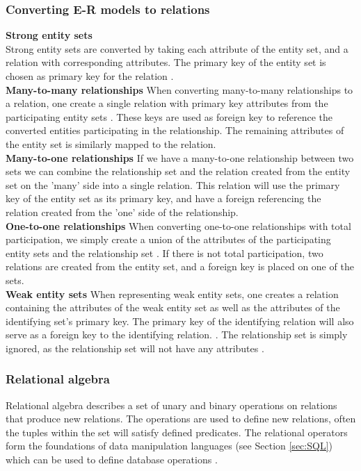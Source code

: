 \subsubsection*{Converting E-R models to relations}
\textbf{Strong entity sets}\\
Strong entity sets are converted by taking each attribute of the entity set, and a relation with corresponding attributes. 
The primary key of the entity set is chosen as primary key for the relation \cite[Chapter 6.7.1]{DBSBook}.\\
\textbf{Many-to-many relationships}
When converting many-to-many relationships to a relation, one create a single relation with primary key attributes from the participating entity sets \cite[Chapter 6.7.1]{DBSBook}. These keys are used as foreign key to reference the converted entities participating in the relationship. 
The remaining attributes of the entity set is similarly mapped to the relation.\\
\textbf{Many-to-one relationships}
If we have a many-to-one relationship between two sets we can combine the relationship set and the relation created from the entity set on the 'many' side into a single relation. This relation will use the primary key of the entity set as its primary key, and have a foreign referencing the relation created from the 'one' side of the relationship.\\
\textbf{One-to-one relationships}
When converting one-to-one relationships with total participation, we simply create a union of the attributes of the participating entity sets and the relationship set \cite[Chapter 6.7.6]{DBSBook}. If there is not total participation, two relations are created from the entity set, and a foreign key is placed on one of the sets.\\
\textbf{Weak entity sets}
When representing weak entity sets, one creates a relation containing the attributes of the weak entity set as well as the attributes of the identifying set's primary key.
The primary key of the identifying relation will also serve as a foreign key to the identifying relation. \cite[Chapter 6.7.1]{DBSBook}.
The relationship set is simply ignored, as the relationship set will not have any attributes \cite[Chapter 6.7.5]{DBSBook}. 


\subsubsection{Relational algebra}\label{sec:relationalAlgebra}
Relational algebra describes a set of unary and binary operations on relations that produce new relations.
The operations are used to define new relations, often the tuples within the set will satisfy defined predicates.
The relational operators form the foundations of data manipulation languages (see Section \ref{sec:SQL}) which can be used to define database operations \cite[Chapter 6.2]{DBSBook}.


